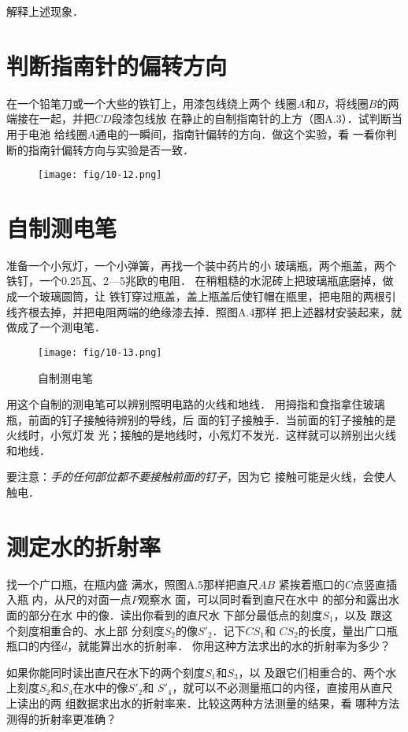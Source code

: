 解释上述现象．

\section{判断指南针的偏转方向}
在一个铅笔刀或一个大些的铁钉上，用漆包线绕上两个
线圈$A$和$B$，将线圈$B$的两端接在一起，并把$CD$段漆包线放
在静止的自制指南针的上方（图A.3）．试判断当用于电池
给线圈$A$通电的一瞬间，指南针偏转的方向．做这个实验，看
一看你判断的指南针偏转方向与实验是否一致．
\begin{figure}[htp]\centering
    \texttt{[image: fig/10-12.png]}
    \caption{}
    \end{figure}

\section{自制测电笔}
准备一个小氖灯，一个小弹簧，再找一个装中药片的小
玻璃瓶，两个瓶盖，两个铁钉，一个0.25瓦、2—5兆欧的电阻．
在稍粗糙的水泥砖上把玻璃瓶底磨掉，做成一个玻璃圆筒，让
铁钉穿过瓶盖，盖上瓶盖后使钉帽在瓶里，把电阻的两根引
线齐根去掉，并把电阻两端的绝缘漆去掉．照图A.4那样
把上述器材安装起来，就做成了一个测电笔．
\begin{figure}[htp]\centering
    \texttt{[image: fig/10-13.png]}
    \caption{自制测电笔}
    \end{figure}

用这个自制的测电笔可以辨别照明电路的火线和地线．
用拇指和食指拿住玻璃瓶，前面的钉子接触待辨别的导线，后
面的钉子接触手．当前面的钉子接触的是火线时，小氖灯发
光；接触的是地线时，小氖灯不发光．这样就可以辨别出火线
和地线．

要注意：\textit{手的任何部位都不要接触前面的钉子}，因为它
接触可能是火线，会使人触电．

\section{测定水的折射率}
找一个广口瓶，在瓶内盛
满水，照图A.5那样把直尺$AB$
紧挨着瓶口的$C$点竖直插入瓶
内，从尺的对面一点$P$观察水
面，可以同时看到直尺在水中
的部分和露出水面的部分在水
中的像．读出你看到的直尺水
下部分最低点的刻度$S_1$，以及
跟这个刻度相重合的、水上部
分刻度$S_2$的像$S'_2$．记下$CS_1$和
$CS_2$的长度，量出广口瓶瓶口的内径$d$，就能算出水的折射率．
你用这种方法求出的水的折射率为多少？
 
如果你能同时读出直尺在水下的两个刻度$S_1$和$S_3$，以
及跟它们相重合的、两个水上刻度$S_2$和$S_4$在水中的像$S'_2$和
$S'_4$，就可以不必测量瓶口的内径，直接用从直尺上读出的两
组数据求出水的折射率来．比较这两种方法测量的结果，看
哪种方法测得的折射率更准确？

